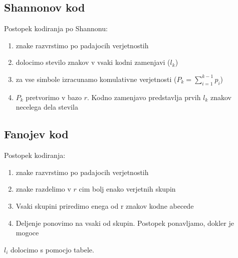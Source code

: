 \documentclass{article}
\begin{document}
\begin{multicols}{4}
\subsection{Shannonov kod}
Postopek kodiranja po Shannonu:
\begin{enumerate}
    \item znake razvrstimo po padajocih verjetnostih
    \item dolocimo stevilo znakov v vsaki kodni zamenjavi ($l_k$)
    \item za vse simbole izracunamo komulativne verjetnosti ($P_k = \sum_{i=1}^{k-1} p_i$)
    \item $P_k$ pretvorimo v bazo $r$. Kodno zamenjavo predstavlja prvih $l_k$ znakov necelega dela stevila
\end{enumerate}

\subsection{Fanojev kod}
Postopek kodiranja:
\begin{enumerate}
    \item znake razvrstimo po padajocih verjetnostih
    \item znake razdelimo v $r$ cim bolj enako verjetnih skupin
    \item Vsaki skupini priredimo enega od r znakov kodne abecede
    \item Deljenje ponovimo na vsaki od skupin. Postopek ponavljamo, dokler je mogoce
\end{enumerate}
$l_i$ dolocimo s pomocjo tabele.


\end{multicols}
\end{document}
